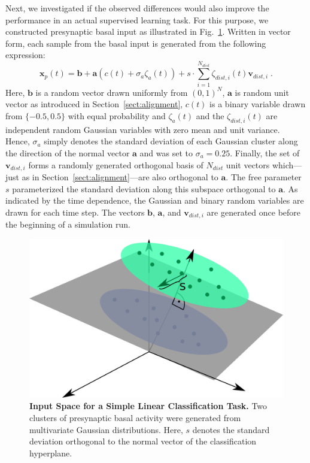 \documentclass[utf8]{frontiersSCNS} %
\begin{document}
Next, we investigated if the observed differences would also improve
the performance in an actual supervised learning task.
For this purpose, we constructed presynaptic basal 
input as illustrated in Fig.~\ref{fig:illustration_classification}.
Written in vector form, each sample from the basal 
input is generated from the following expression:
\begin{equation}
\mathbf{x}_p(t) = \mathbf{b} + \mathbf{a}\left(c(t) + \sigma_a \zeta_a(t) \right) 
+ s \cdot \sum_{i=1}^{N_{dist}} \zeta_{dist,i}(t) \mathbf{v}_{dist,i} \; .
\end{equation}
Here, $\mathbf{b}$ is a random vector drawn uniformly from
$(0,1)^N$, $\mathbf{a}$ is random unit vector as introduced in 
Section~\ref{sect:alignment}, $c(t)$ is a binary variable drawn 
from $\{-0.5,0.5\}$ with equal probability and $\zeta_a(t)$ and the
$\zeta_{dist,i}(t)$ are independent random Gaussian variables with 
zero mean and unit variance. 
Hence, $\sigma_a$ simply denotes the standard deviation of each Gaussian
cluster along the direction of the normal vector $\mathbf{a}$ and was
set to $\sigma_a = 0.25$. 
Finally, the set of $\mathbf{v}_{dist,i}$ forms a randomly generated
orthogonal basis of $N_{dist}$ unit vectors which---just as in 
Section~\ref{sect:alignment}---are also orthogonal to $\mathbf{a}$.
The free parameter $s$ parameterized
the standard deviation along this subspace orthogonal to $\mathbf{a}$.
As indicated by the time dependence, the Gaussian and binary random
variables are drawn for each time step. The vectors
$\mathbf{b}$, $\mathbf{a}$, and $\mathbf{v}_{dist,i}$ are generated
once before the beginning of a simulation run.
\begin{figure}
\centering
\includegraphics[width=0.55\columnwidth]{illustration_classification}
\caption{{\bf Input Space for a Simple Linear Classification Task.}
	Two clusters of presynaptic basal activity were generated from 
	multivariate Gaussian distributions. Here, $s$ denotes the standard
	deviation orthogonal to the normal vector of the classification
	hyperplane.}
\label{fig:illustration_classification}
\end{figure}
\end{document}
